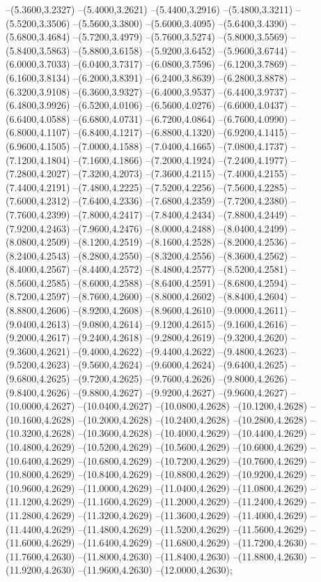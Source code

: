 {	--(5.3600,3.2327)
	--(5.4000,3.2621)
	--(5.4400,3.2916)
	--(5.4800,3.3211)
	--(5.5200,3.3506)
	--(5.5600,3.3800)
	--(5.6000,3.4095)
	--(5.6400,3.4390)
	--(5.6800,3.4684)
	--(5.7200,3.4979)
	--(5.7600,3.5274)
	--(5.8000,3.5569)
	--(5.8400,3.5863)
	--(5.8800,3.6158)
	--(5.9200,3.6452)
	--(5.9600,3.6744)
	--(6.0000,3.7033)
	--(6.0400,3.7317)
	--(6.0800,3.7596)
	--(6.1200,3.7869)
	--(6.1600,3.8134)
	--(6.2000,3.8391)
	--(6.2400,3.8639)
	--(6.2800,3.8878)
	--(6.3200,3.9108)
	--(6.3600,3.9327)
	--(6.4000,3.9537)
	--(6.4400,3.9737)
	--(6.4800,3.9926)
	--(6.5200,4.0106)
	--(6.5600,4.0276)
	--(6.6000,4.0437)
	--(6.6400,4.0588)
	--(6.6800,4.0731)
	--(6.7200,4.0864)
	--(6.7600,4.0990)
	--(6.8000,4.1107)
	--(6.8400,4.1217)
	--(6.8800,4.1320)
	--(6.9200,4.1415)
	--(6.9600,4.1505)
	--(7.0000,4.1588)
	--(7.0400,4.1665)
	--(7.0800,4.1737)
	--(7.1200,4.1804)
	--(7.1600,4.1866)
	--(7.2000,4.1924)
	--(7.2400,4.1977)
	--(7.2800,4.2027)
	--(7.3200,4.2073)
	--(7.3600,4.2115)
	--(7.4000,4.2155)
	--(7.4400,4.2191)
	--(7.4800,4.2225)
	--(7.5200,4.2256)
	--(7.5600,4.2285)
	--(7.6000,4.2312)
	--(7.6400,4.2336)
	--(7.6800,4.2359)
	--(7.7200,4.2380)
	--(7.7600,4.2399)
	--(7.8000,4.2417)
	--(7.8400,4.2434)
	--(7.8800,4.2449)
	--(7.9200,4.2463)
	--(7.9600,4.2476)
	--(8.0000,4.2488)
	--(8.0400,4.2499)
	--(8.0800,4.2509)
	--(8.1200,4.2519)
	--(8.1600,4.2528)
	--(8.2000,4.2536)
	--(8.2400,4.2543)
	--(8.2800,4.2550)
	--(8.3200,4.2556)
	--(8.3600,4.2562)
	--(8.4000,4.2567)
	--(8.4400,4.2572)
	--(8.4800,4.2577)
	--(8.5200,4.2581)
	--(8.5600,4.2585)
	--(8.6000,4.2588)
	--(8.6400,4.2591)
	--(8.6800,4.2594)
	--(8.7200,4.2597)
	--(8.7600,4.2600)
	--(8.8000,4.2602)
	--(8.8400,4.2604)
	--(8.8800,4.2606)
	--(8.9200,4.2608)
	--(8.9600,4.2610)
	--(9.0000,4.2611)
	--(9.0400,4.2613)
	--(9.0800,4.2614)
	--(9.1200,4.2615)
	--(9.1600,4.2616)
	--(9.2000,4.2617)
	--(9.2400,4.2618)
	--(9.2800,4.2619)
	--(9.3200,4.2620)
	--(9.3600,4.2621)
	--(9.4000,4.2622)
	--(9.4400,4.2622)
	--(9.4800,4.2623)
	--(9.5200,4.2623)
	--(9.5600,4.2624)
	--(9.6000,4.2624)
	--(9.6400,4.2625)
	--(9.6800,4.2625)
	--(9.7200,4.2625)
	--(9.7600,4.2626)
	--(9.8000,4.2626)
	--(9.8400,4.2626)
	--(9.8800,4.2627)
	--(9.9200,4.2627)
	--(9.9600,4.2627)
	--(10.0000,4.2627)
	--(10.0400,4.2627)
	--(10.0800,4.2628)
	--(10.1200,4.2628)
	--(10.1600,4.2628)
	--(10.2000,4.2628)
	--(10.2400,4.2628)
	--(10.2800,4.2628)
	--(10.3200,4.2628)
	--(10.3600,4.2628)
	--(10.4000,4.2629)
	--(10.4400,4.2629)
	--(10.4800,4.2629)
	--(10.5200,4.2629)
	--(10.5600,4.2629)
	--(10.6000,4.2629)
	--(10.6400,4.2629)
	--(10.6800,4.2629)
	--(10.7200,4.2629)
	--(10.7600,4.2629)
	--(10.8000,4.2629)
	--(10.8400,4.2629)
	--(10.8800,4.2629)
	--(10.9200,4.2629)
	--(10.9600,4.2629)
	--(11.0000,4.2629)
	--(11.0400,4.2629)
	--(11.0800,4.2629)
	--(11.1200,4.2629)
	--(11.1600,4.2629)
	--(11.2000,4.2629)
	--(11.2400,4.2629)
	--(11.2800,4.2629)
	--(11.3200,4.2629)
	--(11.3600,4.2629)
	--(11.4000,4.2629)
	--(11.4400,4.2629)
	--(11.4800,4.2629)
	--(11.5200,4.2629)
	--(11.5600,4.2629)
	--(11.6000,4.2629)
	--(11.6400,4.2629)
	--(11.6800,4.2629)
	--(11.7200,4.2630)
	--(11.7600,4.2630)
	--(11.8000,4.2630)
	--(11.8400,4.2630)
	--(11.8800,4.2630)
	--(11.9200,4.2630)
	--(11.9600,4.2630)
	--(12.0000,4.2630);
}
